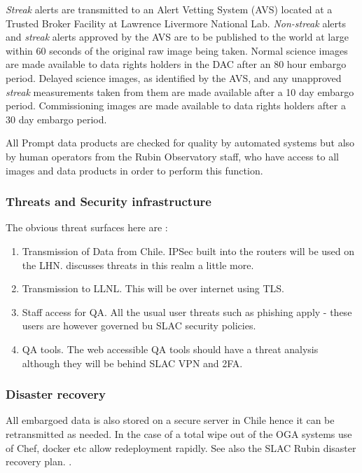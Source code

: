 \emph{Streak} alerts are transmitted to an Alert Vetting System (AVS) located at a Trusted Broker Facility at  Lawrence Livermore National Lab.
\emph{Non-streak} alerts and \emph{streak} alerts approved by the AVS are to be published to the world at large within 60 seconds of the original raw image being taken.
Normal science images are made available to data rights holders in the DAC after an 80 hour embargo period.
Delayed science images, as identified by the AVS, and any unapproved \emph{streak} measurements taken from them are made available after a 10 day embargo period. Commissioning images are made available to data rights holders after a 30 day embargo period.

All Prompt data products are checked for quality by automated systems but also by human operators from the Rubin Observatory staff, who have access to all images and data products in order to perform this function.

\subsubsection{ Threats and Security infrastructure}
The obvious threat surfaces here are :
\begin{enumerate}
\item Transmission of Data from Chile. IPSec built into the routers will be used on the LHN.  discusses threats in this realm a little more.
\item Transmission to LLNL.  This will be over internet using TLS.
\item Staff access for QA. All the usual user threats such as phishing apply - these users are however governed bu SLAC security policies. 
\item QA tools. The web accessible QA tools should have a threat analysis although they will be behind SLAC VPN and 2FA.
\end{enumerate}

\subsubsection{Disaster recovery}
All embargoed data is also stored on a secure server in Chile hence it can be retransmitted as needed.
In the case of a total wipe out of the OGA systems use of Chef, docker etc allow redeployment rapidly.
See also the SLAC Rubin disaster recovery plan. .


